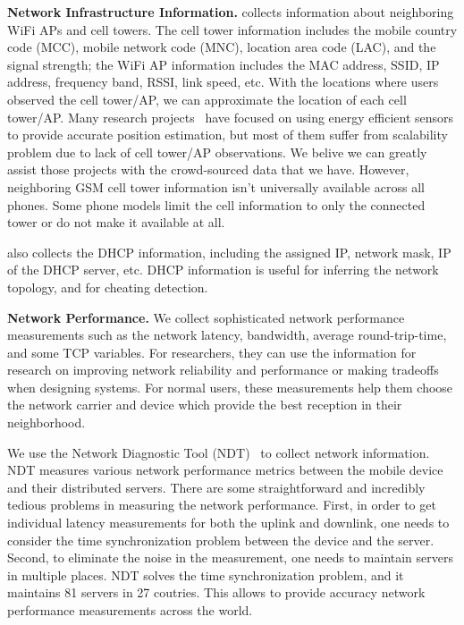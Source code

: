 {\bfseries Network Infrastructure Information.} \name{} collects information about
neighboring WiFi APs and cell towers. The cell tower information includes the mobile country code (MCC), 
mobile network code (MNC), location area code (LAC), and the signal strength; the WiFi AP information
includes the MAC address, SSID, IP address, frequency band, RSSI, link speed, etc.
With the locations where users observed the cell tower/AP, we can approximate the location of 
each cell tower/AP. Many research projects~\cite{ctrack, vtrack-sensys09} have focused on using 
energy efficient sensors to provide accurate position estimation, but most of them suffer from scalability
problem due to lack of cell tower/AP observations. We belive we can greatly assist those projects
with the crowd-sourced data that we have. However, neighboring GSM cell tower information isn't 
universally available across all phones. Some phone models limit the cell information to only 
the connected tower or do not make it available at all.

\name{} also collects the DHCP information, including the assigned IP, network mask, IP of the DHCP server, etc.
DHCP information is useful for inferring the network topology, and for cheating detection.
 
 
{\bfseries Network Performance.} We collect sophisticated network performance measurements 
such as the network latency, bandwidth, average round-trip-time, and some TCP variables. 
For researchers, they can use the information for research on improving network reliability and performance or
 making tradeoffs when designing systems. 
For normal users, these measurements help them choose the network carrier and device which provide
 the best reception in their neighborhood. 

We use the Network Diagnostic Tool (NDT)~\cite{NDT} to collect network information. NDT measures various network 
performance metrics between the mobile device and their distributed servers. There are some straightforward 
and incredibly tedious problems in measuring the network performance. First, in order to get individual latency
measurements for both the uplink and downlink, one needs to consider the time 
synchronization problem between the device and the server. Second, to eliminate the noise in the measurement, 
one needs to maintain servers in multiple places. 
NDT solves the time synchronization problem, and it maintains 81 servers in 27 coutries. This allows \name{}
to provide accuracy network performance measurements across the world.

